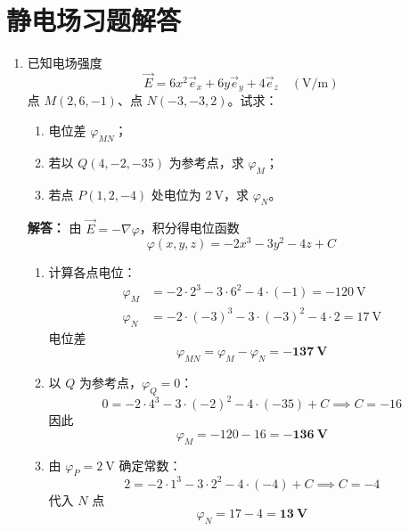 \section{静电场习题解答}

\begin{enumerate}[label=\arabic*.]

\item 已知电场强度
\[
\vec{E}=6x^2\vec{e}_x+6y\vec{e}_y+4\vec{e}_z\quad (\text{V/m})
\]
点 \(M(2,6,-1)\)、点 \(N(-3,-3,2)\)。试求：
\begin{enumerate}[label=(\arabic*)]
    \item 电位差 \(\varphi_{MN}\)；
    \item 若以 \(Q(4,-2,-35)\) 为参考点，求 \(\varphi_M\)；
    \item 若点 \(P(1,2,-4)\) 处电位为 \(2\ \text{V}\)，求 \(\varphi_N\)。
\end{enumerate}

\textbf{解答：}
由 \(\vec{E}=-\nabla\varphi\)，积分得电位函数
\[
\varphi(x,y,z) = -2x^3 - 3y^2 - 4z + C
\]

\begin{enumerate}[label=(\arabic*)]
    \item 计算各点电位：
    \[
    \begin{aligned}
    \varphi_M &= -2\cdot 2^3 - 3\cdot 6^2 - 4\cdot (-1) = -120\ \text{V} \\
    \varphi_N &= -2\cdot (-3)^3 - 3\cdot (-3)^2 - 4\cdot 2 = 17\ \text{V}
    \end{aligned}
    \]
    电位差
    \[
    \varphi_{MN}=\varphi_M-\varphi_N=\boldsymbol{-137\ \text{V}}
    \]

    \item 以 \(Q\) 为参考点，\(\varphi_Q=0\)：
    \[
    0 = -2\cdot 4^3 - 3\cdot (-2)^2 - 4\cdot (-35) + C \implies C = -16
    \]
    因此
    \[
    \varphi_M = -120 - 16 = \boldsymbol{-136\ \text{V}}
    \]

    \item 由 \(\varphi_P=2\ \text{V}\) 确定常数：
    \[
    2 = -2\cdot 1^3 - 3\cdot 2^2 - 4\cdot (-4) + C \implies C = -4
    \]
    代入 \(N\) 点
    \[
    \varphi_N = 17 - 4 = \boldsymbol{13\ \text{V}}
    \]
\end{enumerate}

\vspace{1em}


\end{enumerate}
